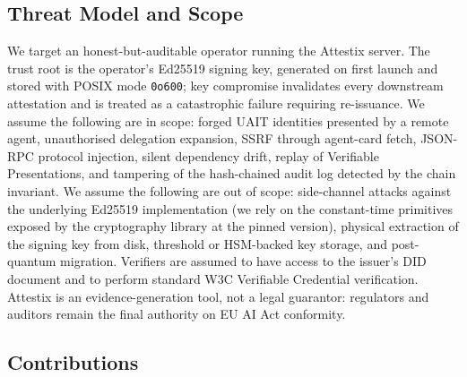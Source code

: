 \documentclass[conference]{IEEEtran}
\begin{document}
\subsection{Threat Model and Scope}
\label{sec:threat}

We target an honest-but-auditable operator running the Attestix server. The trust root is the operator's Ed25519 signing key, generated on first launch and stored with POSIX mode \texttt{0o600}; key compromise invalidates every downstream attestation and is treated as a catastrophic failure requiring re-issuance. We assume the following are in scope: forged UAIT identities presented by a remote agent, unauthorised delegation expansion, SSRF through agent-card fetch, JSON-RPC protocol injection, silent dependency drift, replay of Verifiable Presentations, and tampering of the hash-chained audit log detected by the chain invariant. We assume the following are out of scope: side-channel attacks against the underlying Ed25519 implementation (we rely on the constant-time primitives exposed by the cryptography library at the pinned version), physical extraction of the signing key from disk, threshold or HSM-backed key storage, and post-quantum migration. Verifiers are assumed to have access to the issuer's DID document and to perform standard W3C Verifiable Credential verification. Attestix is an evidence-generation tool, not a legal guarantor: regulators and auditors remain the final authority on EU AI Act conformity.

\subsection{Contributions}
\end{document}
